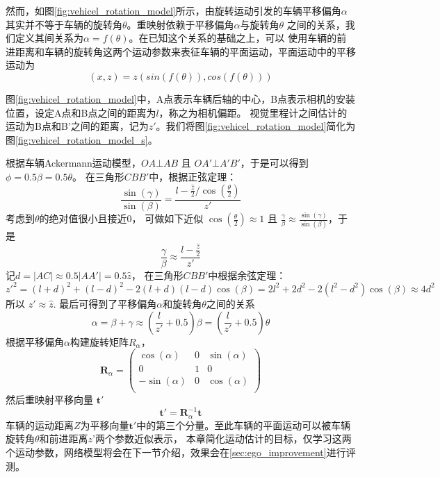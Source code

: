 然而，如图\ref{fig:vehicel_rotation_model}所示，由旋转运动引发的车辆平移偏角$\alpha$其实并不等于车辆的旋转角$\theta$。重映射依赖于平移偏角$\alpha$与旋转角$\theta$ 之间的关系，我们定义其间关系为$\alpha = f(\theta)$。在已知这个关系的基础之上，可以
使用车辆的前进距离和车辆的旋转角这两个运动参数来表征车辆的平面运动，平面运动中的平移运动为
\begin{equation}
    (x,z) = z(sin(f(\theta)),cos(f(\theta)))
    \label{eq:car_angle}
\end{equation}

图\ref{fig:vehicel_rotation_model}中，A点表示车辆后轴的中心，B点表示相机的安装位置，设定A点和B点之间的距离为$l$，称之为相机偏距。
视觉里程计之间估计的运动为B点和B'之间的距离，记为$z'$。我们将图\ref{fig:vehicel_rotation_model}简化为图\ref{fig:vehicel_rotation_model_s}。

根据车辆Ackermann运动模型\cite{siegwart2011introduction}，$OA \bot AB$ 且 $OA' \bot A'B'$，于是可以得到 $\phi = 0.5 \beta = 0.5 \theta$。
在三角形$CBB'$中，根据正弦定理：
\begin{equation}
    \frac{\sin(\gamma)}{\sin(\beta)}  = \frac{l-\frac{\hat{z}}{2} / \cos(\frac{\theta}{2})}{z'} 
 \end{equation}
考虑到$\theta$的绝对值很小且接近0， 可做如下近似 $\cos(\frac{\theta}{2}) \approx 1$ 且 $ \frac{\gamma}{\beta} \approx  \frac{\sin(\gamma)}{\sin(\beta)} $，于是
\begin{equation}
    \frac{\gamma}{\beta}  \approx \frac{l-\frac{\hat{z}}{2}}{z'} 
\end{equation}
记$d = |AC| \approx 0.5|AA'| =0.5\hat{z}$， 在三角形$CBB'$中根据余弦定理：
\begin{equation}
    z'^2 = (l+d)^2 + (l-d)^2- 2(l+d)(l-d)\cos(\beta) = 2l^2+2d^2 - 2(l^2-d^2)\cos(\beta)\approx 4d^2
\end{equation}
所以 $z'\approx \hat{z}$.
最后可得到了平移偏角$\alpha$和旋转角$\theta$之间的关系
\begin{equation}
    \alpha = \beta + \gamma \approx (\frac{l}{z'}+0.5)\beta =(\frac{l}{z'}+0.5)\theta
    \label{eq:r_t_ratio}
\end{equation}
根据平移偏角$\alpha$构建旋转矩阵$R_\alpha$，
\begin{equation}
    \mathbf{R}_\alpha = \begin{pmatrix}
        \cos(\alpha)& 0 & \sin(\alpha)\\ 
        0 & 1 & 0\\ 
        -\sin(\alpha)& 0 & \cos(\alpha)\\ 
    \end{pmatrix} 
    \label{eq:r_alpha}
\end{equation}
然后重映射平移向量 $\mathbf{t}'$
\begin{equation}
    \mathbf{t}' = \mathbf{R}_\alpha^{-1}\mathbf{t}
    \label{eq:decouple_z}
\end{equation}
车辆的运动距离$Z$为平移向量$\mathbf{t}'$中的第三个分量。至此车辆的平面运动可以被车辆旋转角$\theta$和前进距离$z’$两个参数近似表示，
本章简化运动估计的目标，仅学习这两个运动参数，网络模型将会在下一节介绍，效果会在\ref{sec:ego_improvement}进行评测。

